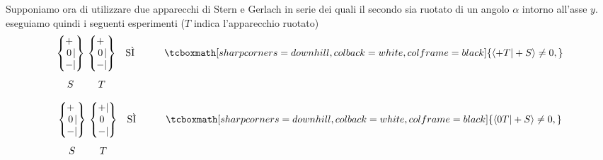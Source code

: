 \documentclass[a4paper,12pt,oneside]{book}
\begin{document}
Supponiamo ora di utilizzare due apparecchi di Stern e Gerlach in serie dei quali il secondo sia ruotato di un angolo $\alpha$ intorno all'asse $y$. eseguiamo quindi i seguenti esperimenti ($T$ indica l'apparecchio ruotato)
	\begin{equation}
		\begin{matrix}
		\begin{Bmatrix}
 			\makebox[\widthof{$-$}]{$+$}\makebox[\widthof{$|$}]{$\ $} \\ \makebox[\widthof{$-$}]{$0$}|\\ - | 
		\end{Bmatrix} \\[0.7cm]
			S
		\end{matrix} \
		\begin{matrix}
		\begin{Bmatrix}
			\makebox[\widthof{$-$}]{$+$}\makebox[\widthof{$|$}]{$\ $} \\ \makebox[\widthof{$-$}]{$0$}|\\ - | 
		\end{Bmatrix} & \textrm{SÌ} & \qquad\tcboxmath[sharp corners=downhill, colback=white, colframe=black]{\langle +T | +S \rangle \neq 0,} \\[0.7cm]
			T & &
		\end{matrix}
	\label{SG5}
	\end{equation}

	\begin{equation}
		\begin{matrix}
		\begin{Bmatrix}
			\makebox[\widthof{$-$}]{$+$}\makebox[\widthof{$|$}]{$\ $} \\ \makebox[\widthof{$-$}]{$0$}|\\ - | 
		\end{Bmatrix} \\[0.7cm]
			S
		\end{matrix} \
		\begin{matrix}
		\begin{Bmatrix}
			\makebox[\widthof{$-$}]{$+$} | \\ \makebox[\widthof{$-$}]{$0$}\makebox[\widthof{$|$}]{$\ $} \\ - | 
		\end{Bmatrix} & \textrm{SÌ} & \qquad\tcboxmath[sharp corners=downhill, colback=white, colframe=black]{\langle 0T | +S \rangle \neq 0,} \\[0.7cm]
			T & &
		\end{matrix}
	\label{SG6}
	\end{equation}
\end{document}
